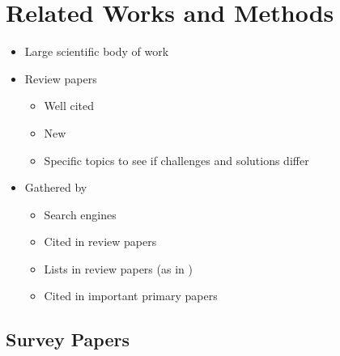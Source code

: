 \documentclass{article}
\begin{document}
\section{Related Works and Methods}
\begin{itemize}
    \item Large scientific body of work
    \item Review papers
          \begin{itemize}
              \item Well cited
              \item New
              \item Specific topics to see if challenges and solutions differ
          \end{itemize}
    \item Gathered by
          \begin{itemize}
              \item Search engines
              \item Cited in review papers
              \item Lists in review papers (as in \cite{Demystifying})
              \item Cited in important primary papers
          \end{itemize}
\end{itemize}

\subsection{Survey Papers}
\end{document}
